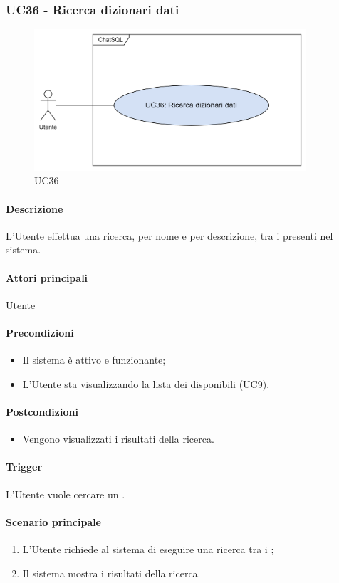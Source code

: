 \subsubsection{UC36 - Ricerca dizionari dati}\label{UC36}

\begin{figure}[H]
  \centering
  \includegraphics[width=0.90\textwidth]{assets/uc36.png}
  \caption{UC36}
\end{figure}

\paragraph*{Descrizione}
L'Utente effettua una ricerca, per nome e per descrizione, tra i  presenti nel sistema.

\paragraph*{Attori principali}
Utente

\paragraph*{Precondizioni}
\begin{itemize}
  \item Il sistema è attivo e funzionante;
  \item L'Utente sta visualizzando la lista dei  disponibili (\hyperref[UC9]{UC9}).
\end{itemize}

\paragraph*{Postcondizioni}
\begin{itemize}
  \item Vengono visualizzati i risultati della ricerca.
\end{itemize}

\paragraph*{Trigger}
L'Utente vuole cercare un .

\paragraph*{Scenario principale}
\begin{enumerate}
  \item L'Utente richiede al sistema di eseguire una ricerca tra i ;
  \item Il sistema mostra i risultati della ricerca.
\end{enumerate}
